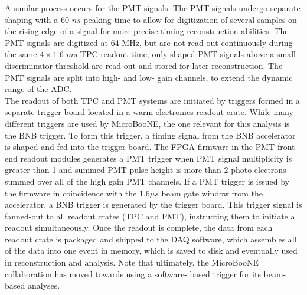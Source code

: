 A similar process occurs for the PMT signals. The PMT signals undergo separate shaping with a 60 $ns$ peaking time to allow for digitization of several samples on the rising edge of a signal for more precise timing reconstruction abilities. The PMT signals are digitized at 64 MHz, but are not read out continuously during the same $4 \times 1.6$ $ms$ TPC readout time; only shaped PMT signals above a small discriminator threshold are read out and stored for later reconstruction. The PMT signals are split into high- and low- gain channels, to extend the dynamic range of the ADC.\\

The readout of both TPC and PMT systems are initiated by triggers formed in a separate trigger board located in a warm electronics readout crate. While many different triggers are used by MicroBooNE, the one relevant for this analysis is the BNB trigger. To form this trigger, a timing signal from the BNB accelerator is shaped and fed into the trigger board. The FPGA firmware in the PMT front end readout modules generates a PMT trigger when PMT signal multiplicity is greater than 1 and summed PMT pulse-height is more than 2 photo-electrons summed over all of the high gain PMT channels. If a PMT trigger is issued by the firmware in coincidence with the $1.6 \mu s$ beam gate window from the accelerator, a BNB trigger is generated by the trigger board. This trigger signal is fanned-out to all readout crates (TPC and PMT), instructing them to initiate a readout simultaneously. Once the readout is complete, the data from each readout crate is packaged and shipped to the DAQ software, which assembles all of the data into one event in memory, which is saved to disk and eventually used in reconstruction and analysis. Note that ultimately, the MicroBooNE collaboration has moved towards using a software- based trigger for its beam-based analyses.

